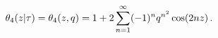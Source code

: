 \[\mathop{\theta_{4}\/}\nolimits\!\left(z\middle|\tau\right)=\mathop{\theta_{4}%
\/}\nolimits\!\left(z,q\right)=1+2\sum\limits_{n=1}^{\infty}(-1)^{n}q^{n^{2}}%
\mathop{\cos\/}\nolimits\!\left(2nz\right).\]